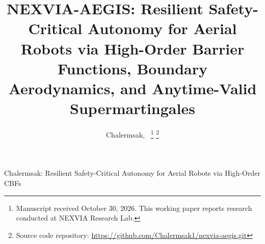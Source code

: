 \documentclass[journal,10pt]{IEEEtran}
\begin{document}
\setlength{\textfloatsep}{5pt plus 1pt minus 1pt}
\setlength{\floatsep}{4pt plus 1pt minus 1pt}
\setlength{\dbltextfloatsep}{6pt plus 1pt minus 1pt}
\setlength{\dblfloatsep}{4pt plus 1pt minus 1pt}

\let\oldbibliography\thebibliography
\renewcommand{\thebibliography}[1]{%
  \oldbibliography{#1}%
  \setlength{\itemsep}{0pt plus 0.1pt}%
  \setlength{\parsep}{0pt}%
}

\title{NEXVIA-AEGIS: Resilient Safety-Critical Autonomy for Aerial Robots via High-Order Barrier Functions, Boundary Aerodynamics, and Anytime-Valid Supermartingales}

\author{Chalermsak,~
\thanks{Manuscript received October 30, 2026. This working paper reports research conducted at NEXVIA Research Lab.}
\thanks{Source code repository: \url{https://github.com/Chalermsak1/nexvia-aegis.git}}
}

%
{Chalermsak: Resilient Safety-Critical Autonomy for Aerial Robots via High-Order CBFs}

\maketitle
\end{document}
